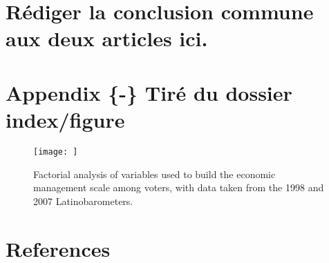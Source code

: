 \documentclass[12pt]{ulaval}
\begin{document}
\chapter{Rédiger la conclusion commune aux deux articles
ici.}\label{rediger-la-conclusion-commune-aux-deux-articles-ici.}

\appendix

\chapter{Appendix \{-\} Tiré du dossier
index/figure}\label{appendix---tire-du-dossier-indexfigure}
\begin{figure}[H]

{\centering \texttt{[image: ]} 

}

\caption{\label{fig:factorAnalysis}Factorial analysis of variables used to build the economic management scale among voters, with data taken from the 1998 and 2007 Latinobarometers.}\label{fig:unnamed-chunk-3}
\end{figure}
\backmatter

\chapter*{References}\label{references}


\noindent

\setlength{\parindent}{-0.20in} \setlength{\leftskip}{0.20in}
\setlength{\parskip}{8pt}


\end{document}
